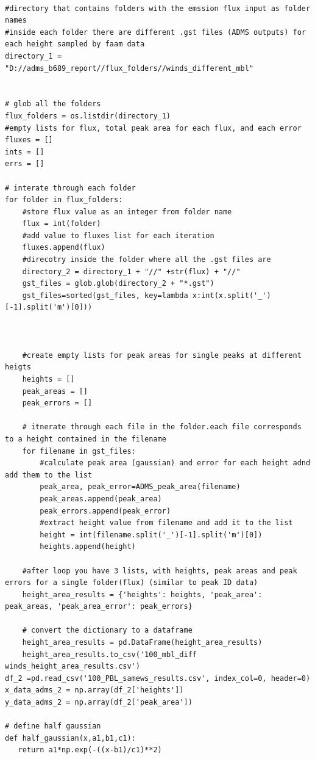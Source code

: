 \documentclass[12pt]{article}
\begin{document}
\begin{lstlisting}
    
#directory that contains folders with the emssion flux input as folder names
#inside each folder there are different .gst files (ADMS outputs) for each height sampled by faam data
directory_1 = "D://adms_b689_report//flux_folders//winds_different_mbl"


# glob all the folders
flux_folders = os.listdir(directory_1)
#empty lists for flux, total peak area for each flux, and each error
fluxes = []
ints = []
errs = []

# interate through each folder 
for folder in flux_folders:
    #store flux value as an integer from folder name 
    flux = int(folder) 
    #add value to fluxes list for each iteration 
    fluxes.append(flux)
    #direcotry inside the folder where all the .gst files are 
    directory_2 = directory_1 + "//" +str(flux) + "//"
    gst_files = glob.glob(directory_2 + "*.gst") 
    gst_files=sorted(gst_files, key=lambda x:int(x.split('_')[-1].split('m')[0]))
        
    
    
    #create empty lists for peak areas for single peaks at different heigts
    heights = []
    peak_areas = []
    peak_errors = []
    
    # itnerate through each file in the folder.each file corresponds to a height contained in the filename
    for filename in gst_files:
        #calculate peak area (gaussian) and error for each height adnd add them to the list 
        peak_area, peak_error=ADMS_peak_area(filename)
        peak_areas.append(peak_area)
        peak_errors.append(peak_error)
        #extract height value from filename and add it to the list
        height = int(filename.split('_')[-1].split('m')[0]) 
        heights.append(height)
            
    #after loop you have 3 lists, with heights, peak areas and peak errors for a single folder(flux) (similar to peak ID data)
    height_area_results = {'heights': heights, 'peak_area': peak_areas, 'peak_area_error': peak_errors}

    # convert the dictionary to a dataframe 
    height_area_results = pd.DataFrame(height_area_results)
    height_area_results.to_csv('100_mbl_diff winds_height_area_results.csv')
df_2 =pd.read_csv('100_PBL_samews_results.csv', index_col=0, header=0)
x_data_adms_2 = np.array(df_2['heights'])
y_data_adms_2 = np.array(df_2['peak_area'])

# define half gaussian
def half_gaussian(x,a1,b1,c1):
   return a1*np.exp(-((x-b1)/c1)**2)


\end{lstlisting}
\end{document}
